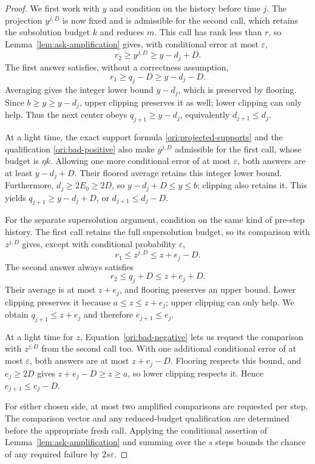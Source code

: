 \begin{proof}
We first work with \(y\) and condition on the history before time
\(j\). The projection \(y^{j,D}\) is now fixed and is admissible
for the second call, which retains the subsolution budget \(k\) and
reduces \(m\). This call has rank less than \(r\), so
Lemma~\ref{lem:ask-amplification} gives, with conditional error at
most \(\varepsilon\),
\[
  r_2\geq y^{j,D}\geq y-d_j+D.
\]
The first answer satisfies, without a correctness assumption,
\[
  r_1\geq q_j-D\geq y-d_j-D.
\]
Averaging gives the integer lower bound \(y-d_j\), which is preserved
by flooring. Since \(b\geq y\geq y-d_j\), upper clipping preserves
it as well; lower clipping can only help. Thus the next center obeys
\(q_{j+1}\geq y-d_j\), equivalently \(d_{j+1}\leq d_j\).

At a light time, the exact support formula
\eqref{ori:projected-supports} and the qualification
\eqref{ori:bad-positive} also make \(y^{j,D}\) admissible for the
first call, whose budget is \(\eta k\). Allowing one more conditional
error of at most \(\varepsilon\), both answers are at least
\(y-d_j+D\). Their floored average retains this integer lower bound.
Furthermore, \(d_j\geq2E_0\geq2D\), so
\(y-d_j+D\leq y\leq b\); clipping also retains it. This yields
\(q_{j+1}\geq y-d_j+D\), or \(d_{j+1}\leq d_j-D\).

For the separate supersolution argument, condition on the same kind
of pre-step history. The first call retains the full supersolution
budget, so its comparison with \(z^{j,D}\) gives, except with
conditional probability \(\varepsilon\),
\[
  r_1\leq z^{j,D}\leq z+e_j-D.
\]
The second answer always satisfies
\[
  r_2\leq q_j+D\leq z+e_j+D.
\]
Their average is at most \(z+e_j\), and flooring preserves an upper
bound. Lower clipping preserves it because
\(a\leq z\leq z+e_j\); upper clipping can only help. We obtain
\(q_{j+1}\leq z+e_j\) and therefore \(e_{j+1}\leq e_j\).

At a light time for \(z\), Equation~\eqref{ori:bad-negative} lets
us request the comparison with \(z^{j,D}\) from the second call too.
With one additional conditional error of at most \(\varepsilon\),
both answers are at most \(z+e_j-D\). Flooring respects this bound,
and \(e_j\geq2D\) gives \(z+e_j-D\geq z\geq a\), so lower
clipping respects it. Hence \(e_{j+1}\leq e_j-D\).

For either chosen side, at most two amplified comparisons are requested
per step. The comparison vector and any reduced-budget qualification
are determined before the appropriate fresh call. Applying the
conditional assertion of Lemma~\ref{lem:ask-amplification} and summing
over the \(s\) steps bounds the chance of any required failure by
\(2s\varepsilon\).
\end{proof}

